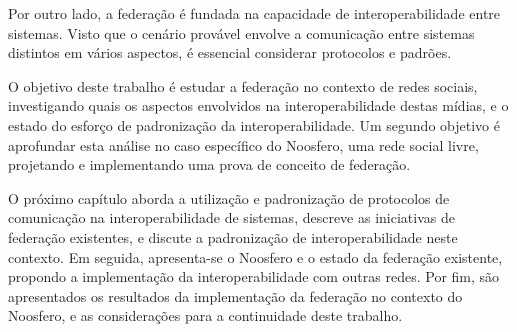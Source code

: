Por outro lado, a federação é fundada na capacidade de interoperabilidade entre
sistemas. Visto que o cenário provável envolve a comunicação entre sistemas
distintos em vários aspectos, é essencial considerar protocolos e padrões.

O objetivo deste trabalho é estudar a federação no contexto de redes sociais,
investigando quais os aspectos envolvidos na interoperabilidade destas mídias, e o
estado do esforço de padronização da interoperabilidade. Um segundo objetivo é
aprofundar esta análise no caso específico do Noosfero, uma rede social livre,
projetando e implementando uma prova de conceito de federação.

O próximo capítulo aborda a utilização e padronização de protocolos de comunicação
na interoperabilidade de sistemas, descreve as iniciativas de federação existentes,
e discute a padronização de interoperabilidade neste contexto. Em seguida,
apresenta-se o Noosfero e o estado da federação existente, propondo a implementação
da interoperabilidade com outras redes. Por fim, são apresentados os resultados da
implementação da federação no contexto do Noosfero, e as considerações para a
continuidade deste trabalho.

